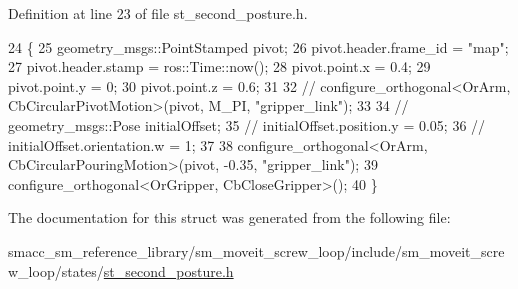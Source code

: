 Definition at line 23 of file st\+\_\+second\+\_\+posture.\+h.


\begin{DoxyCode}
24         \{
25             geometry\_msgs::PointStamped pivot;
26             pivot.header.frame\_id = \textcolor{stringliteral}{"map"};
27             pivot.header.stamp = ros::Time::now();
28             pivot.point.x = 0.4;
29             pivot.point.y = 0;
30             pivot.point.z = 0.6;
31 
32             \textcolor{comment}{// configure\_orthogonal<OrArm, CbCircularPivotMotion>(pivot, M\_PI, "gripper\_link");}
33 
34             \textcolor{comment}{// geometry\_msgs::Pose initialOffset;}
35             \textcolor{comment}{// initialOffset.position.y = 0.05;}
36             \textcolor{comment}{// initialOffset.orientation.w = 1;}
37 
38             configure\_orthogonal<OrArm, CbCircularPouringMotion>(pivot, -0.35, \textcolor{stringliteral}{"gripper\_link"});
39             configure\_orthogonal<OrGripper, CbCloseGripper>();
40         \}
\end{DoxyCode}


The documentation for this struct was generated from the following file\+:\begin{DoxyCompactItemize}
\item 
smacc\+\_\+sm\+\_\+reference\+\_\+library/sm\+\_\+moveit\+\_\+screw\+\_\+loop/include/sm\+\_\+moveit\+\_\+screw\+\_\+loop/states/\hyperlink{st__second__posture_8h}{st\+\_\+second\+\_\+posture.\+h}\end{DoxyCompactItemize}
